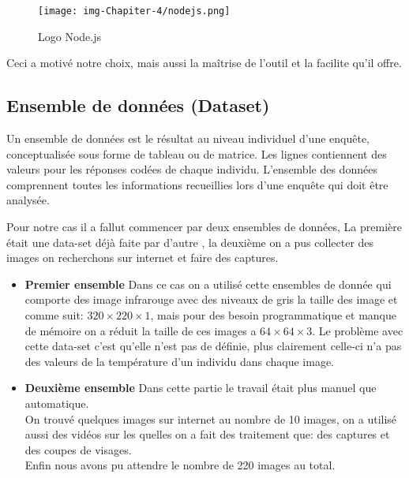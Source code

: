 \documentclass[12pt]{article}
\begin{document}
\begin{figure}[h]
	\centering
	\texttt{[image: img-Chapiter-4/nodejs.png]}
	\caption{Logo Node.js}
\end{figure}

Ceci  a motivé notre choix, mais aussi la maîtrise de l’outil et la facilite qu'il offre.


\subsection{Ensemble de données (Dataset)}
Un ensemble de données est le résultat au niveau individuel d’une enquête, conceptualisée sous forme de tableau ou de matrice. Les lignes contiennent des valeurs pour les réponses codées de chaque individu. L’ensemble des données comprennent toutes les informations recueillies lors d'une enquête qui doit être analysée.

Pour notre cas il a fallut commencer par deux ensembles de données, La première était une data-set déjà faite par d’autre \cite{47}, la deuxième on a pus collecter des images on recherchons sur internet et faire des captures.
\begin{itemize}
	\item \textbf{Premier ensemble} Dans ce cas on a utilisé cette ensembles de donnée \cite{47} qui comporte des image infrarouge avec des niveaux de gris la taille des image et comme suit: $320 \times 220 \times 1$, mais pour des besoin programmatique et manque de mémoire on a réduit la taille de ces images a $64 \times 64 \times 3$. Le problème avec cette data-set c’est qu’elle n’est pas de définie, plus clairement celle-ci n’a pas des valeurs de la température d’un individu dans chaque image.
	\item \textbf{Deuxième ensemble} Dans cette partie le travail était plus manuel que automatique.\\
	On trouvé quelques images sur internet au nombre de 10 images, on a utilisé aussi des vidéos sur les quelles on a fait des traitement que: des captures et des coupes de visages.\\
	Enfin nous avons pu attendre le nombre de 220 images au total.\\  
\end{itemize}
\end{document}

